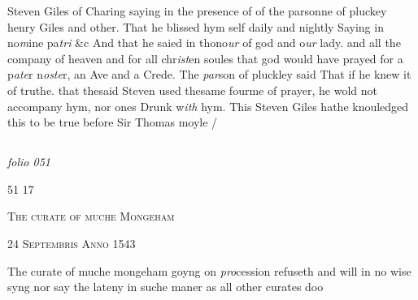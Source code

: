 \documentclass[12pt, a4paper]{book}
\begin{document}
               	
		\ifthenelse{\isodd{\thepage}}
		{\reversemarginpar}
		{\normalmarginpar}
		Steven Giles of Charing saying in the presence of
 	of the parsonne of pluckey henry Giles and other. That
 he blissed hym self daily and nightly Saying in no\textit{m}ine pa\textit{tri}
 \&c And that he saied in thono\textit{ur} of god and o\textit{ur} lady.
 and all the company of heaven and for all chr\textit{ist}en soules
 that god would have prayed for a p\textit{ate}r n\textit{oste}r, an Ave
 	and a Crede. The \textit{par}son of pluckley said That
 if he knew it of truthe. that thesaid Steven used
 thesame fourme of prayer, he wold not accompany
 hym, nor ones Drunk w\textit{ith} hym. This Steven
 Giles hathe knouledged this to be true before
 	Sir Thomas moyle /


            
            
\dotfill
						\newpage {} \subsection*{}

\textit{folio 051}


\begin{flushright}{\color{Mahogany}51} 17\end{flushright}
 

	
				\begin{center} \begin{large} {\scshape The curate of muche Mongeham} \end{large} \end{center}
			
	
		
				\begin{center}  {\scshape 24 Septembris Anno 1543}  \end{center}
			
		
			
				\marginpar[\vspace{0.5cm}{\textcolor{Gray}{The curate of moche mongeham}}]{}
			
			
		\ifthenelse{\isodd{\thepage}}
		{\reversemarginpar}
		{\normalmarginpar}
		The curate of muche mongeham goyng on \textit{pro}cession
				refuseth and will in no wise syng nor say the lateny
				in suche maner as all other curates doo
		
	
            
            
            	
\end{document}
